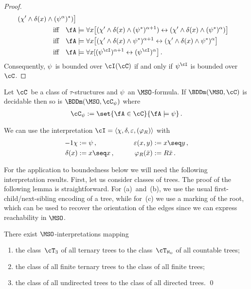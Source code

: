 \documentclass{LMCS}
\begin{document}
\begin{proof}
\begin{align*}
                              (\chi' \land \delta(x) \land (\psi^\alpha)^*)\bigr] \\
\text{iff}\quad
  \fA &\models \forall x\bigl[(\chi' \land \delta(x) \land (\psi^*)^{\alpha+1}) \leftrightarrow
                              (\chi' \land \delta(x) \land (\psi^*)^\alpha)\bigr] \\
\text{iff}\quad
  \fA &\models \forall x\bigl[(\chi' \land \delta(x) \land \psi^*)^{\alpha+1} \leftrightarrow
                              (\chi' \land \delta(x) \land \psi^*)^\alpha\bigr] \\
\text{iff}\quad
  \fA &\models \forall x[(\psi^\cI)^{\alpha+1} \leftrightarrow (\psi^\cI)^\alpha\bigr]\,.
\end{align*}
Consequently, $\psi$~is bounded over $\cI(\cC)$
if and only if $\psi^\cI$ is bounded over~$\cC$.
\end{proof}

\begin{cor}\label{cor:decidability and subclasses}
Let $\cC$~be a class of $\tau$-structures and $\psi$~an $\MSO$-formula.
If\/ $\BDDm(\MSO,\cC)$ is decidable then so is
$\BDDm(\MSO,\cC_\psi)$ where
\begin{align*}
  \cC_\psi := \set{ \fA \in \cC }{ \fA \models \psi }\,.
\end{align*}
\end{cor}
\proof
We can use the interpretation $\cI = \langle\chi,\delta,\varepsilon,(\varphi_R)\rangle$
with
\begin{alignat*}{-1}
  \chi &:= \psi\,, &\qquad
  \varepsilon(x,y) &:= x\seq y\,, \\
  \delta(x) &:= x\seq x\,, &\qquad
  \varphi_R(\bar x) &:= R\bar x\,.\rlap{\hbox to 143 pt{\hfill\qEd}}
\end{alignat*}


For the application to boundedness below we will need the following
interpretation results. First, let us consider classes of trees.
The proof of the following lemma is straightforward.
For (a)~and~(b), we use the usual first-child/next-sibling encoding of a tree,
while for~(c) we use a marking of the root, which can be used to recover the
orientation of the edges since we can express reachability in $\MSO$.
\begin{lem}\label{lem: tree interpretations}
There exist $\MSO$-interpretations mapping
\begin{enumerate}
\item the class~$\cT_3$ of all ternary trees to the class~$\cT_{\aleph_0}$ of all countable trees\?;
\item the class of all finite ternary trees to the class of all finite trees\?;
\item the class of all undirected trees to the class of all directed trees.
\qed\end{enumerate}
\end{lem}
\end{document}
